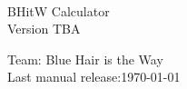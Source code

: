 \documentclass[a5paper, 11pt]{article}
\begin{document}
\begin{titlepage}
    \begin{center}
        \,
        
        \Huge
        BHitW Calculator\\
    
        \LARGE
        Version TBA
        
        \Large
        Team:               \hfill Blue Hair is the Way\\
        Last manual release:\hfill \today
    \end{center}
\end{titlepage}
\end{document}
